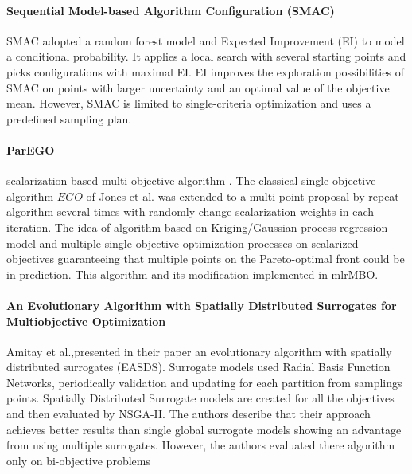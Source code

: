         \paragraph{Sequential Model-based Algorithm Configuration (SMAC)} SMAC\cite{smac-2017} adopted a random forest model and Expected Improvement (EI) to model a conditional probability. It applies a local search with several starting points and picks configurations with maximal EI. EI improves the exploration possibilities of SMAC on points with larger uncertainty and an optimal value of the objective mean. However, SMAC is limited to single-criteria optimization and uses a predefined sampling plan.


        \paragraph{ParEGO} scalarization based multi-objective algorithm \cite{Knowles06}. The classical single-objective algorithm $EGO$ of Jones et al.  was extended to a multi-point proposal by repeat algorithm several times with randomly change scalarization weights in each iteration. The idea of algorithm based on Kriging/Gaussian process regression model and multiple single objective optimization processes on scalarized objectives guaranteeing that multiple points on the Pareto-optimal front could be in prediction. This algorithm and its modification implemented in mlrMBO\cite{BischlmlrMBO}.


        \paragraph{An Evolutionary Algorithm with Spatially Distributed Surrogates for Multiobjective Optimization} Amitay et al.,\cite{DistrSurr}presented in their paper an evolutionary algorithm with spatially distributed surrogates (EASDS). Surrogate models used Radial Basis Function Networks, periodically validation and updating for each partition from samplings points. Spatially Distributed Surrogate models are created for all the objectives and then evaluated by NSGA-II. The authors describe that their approach achieves better results than single global surrogate models showing an advantage from using multiple surrogates. However, the authors evaluated there algorithm only on bi-objective problems

